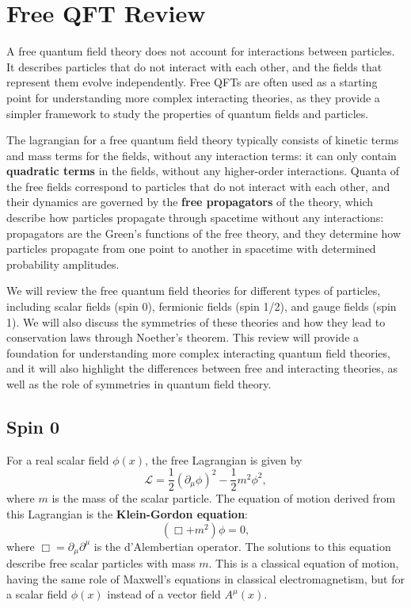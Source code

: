 \chapter{Free QFT Review}

A free quantum field theory does not account for interactions between particles. It describes particles that do not interact with each other, and the fields that represent them evolve independently. Free QFTs are often used as a starting point for understanding more complex interacting theories, as they provide a simpler framework to study the properties of quantum fields and particles.

The lagrangian for a free quantum field theory typically consists of kinetic terms and mass terms for the fields, without any interaction terms: it can only contain \textbf{quadratic terms} in the fields, without any higher-order interactions.
Quanta of the free fields correspond to particles that do not interact with each other, and their dynamics are governed by the \textbf{free propagators} of the theory, which describe how particles propagate through spacetime without any interactions: propagators are the Green's functions of the free theory, and they determine how particles propagate from one point to another in spacetime with determined probability amplitudes.

We will review the free quantum field theories for different types of particles, including scalar fields (spin 0), fermionic fields (spin 1/2), and gauge fields (spin 1). We will also discuss the symmetries of these theories and how they lead to conservation laws through Noether's theorem. This review will provide a foundation for understanding more complex interacting quantum field theories, and it will also highlight the differences between free and interacting theories, as well as the role of symmetries in quantum field theory.

\section{Spin 0}

For a real scalar field $\phi(x)$, the free Lagrangian is given by
\[
    \mathcal{L} = \frac{1}{2} (\partial_\mu \phi)^2 - \frac{1}{2} m^2 \phi^2,
    \label{eq:free_KG_lagrangian}
\]
where $m$ is the mass of the scalar particle. The equation of motion derived from this Lagrangian is the \textbf{Klein-Gordon equation}:
\[
    (\Box + m^2) \phi = 0,
    \label{eq:free_KG_equation}
\]
where $\Box = \partial_\mu \partial^\mu$ is the d'Alembertian operator. The solutions to this equation describe free scalar particles with mass $m$. This is a classical equation of motion, having the same role of Maxwell's equations in classical electromagnetism, but for a scalar field \(\phi(x)\) instead of a vector field \(A^{\mu}(x)\).

